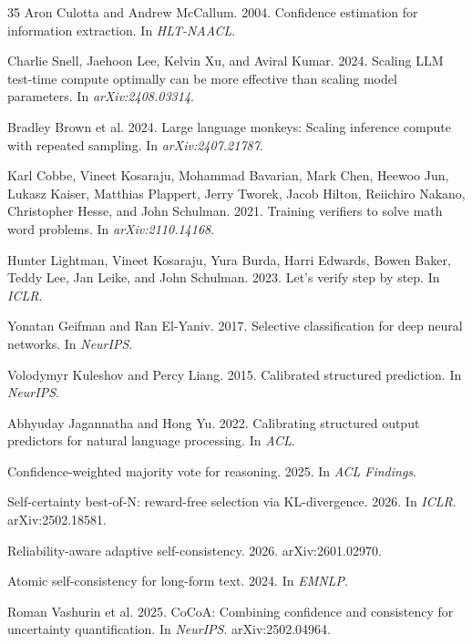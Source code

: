 \documentclass[11pt,a4paper]{article}
\begin{document}
\begin{thebibliography}{35}
Aron Culotta and Andrew McCallum. 2004.
Confidence estimation for information extraction.
In \emph{HLT-NAACL}.

Charlie Snell, Jaehoon Lee, Kelvin Xu, and Aviral Kumar. 2024.
Scaling LLM test-time compute optimally can be more effective than scaling model parameters.
In \emph{arXiv:2408.03314}.

Bradley Brown et al. 2024.
Large language monkeys: Scaling inference compute with repeated sampling.
In \emph{arXiv:2407.21787}.

Karl Cobbe, Vineet Kosaraju, Mohammad Bavarian, Mark Chen, Heewoo Jun, Lukasz Kaiser, Matthias Plappert, Jerry Tworek, Jacob Hilton, Reiichiro Nakano, Christopher Hesse, and John Schulman. 2021.
Training verifiers to solve math word problems.
In \emph{arXiv:2110.14168}.

Hunter Lightman, Vineet Kosaraju, Yura Burda, Harri Edwards, Bowen Baker, Teddy Lee, Jan Leike, and John Schulman. 2023.
Let's verify step by step.
In \emph{ICLR}.

Yonatan Geifman and Ran El-Yaniv. 2017.
Selective classification for deep neural networks.
In \emph{NeurIPS}.

Volodymyr Kuleshov and Percy Liang. 2015.
Calibrated structured prediction.
In \emph{NeurIPS}.

Abhyuday Jagannatha and Hong Yu. 2022.
Calibrating structured output predictors for natural language processing.
In \emph{ACL}.

Confidence-weighted majority vote for reasoning. 2025.
In \emph{ACL Findings}.

Self-certainty best-of-N: reward-free selection via KL-divergence. 2026.
In \emph{ICLR}. arXiv:2502.18581.

Reliability-aware adaptive self-consistency. 2026.
arXiv:2601.02970.

Atomic self-consistency for long-form text. 2024.
In \emph{EMNLP}.

Roman Vashurin et al. 2025.
CoCoA: Combining confidence and consistency for uncertainty quantification.
In \emph{NeurIPS}. arXiv:2502.04964.


\end{thebibliography}
\end{document}
